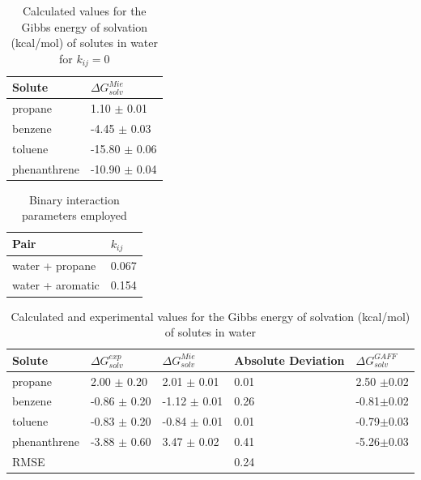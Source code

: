 \begin{table}[h]
	\centering
	\caption{Calculated values for the Gibbs energy of solvation (kcal/mol) of solutes in water for $k_{ij}=0$}
	\label{tbl:solv3}
	\begin{tabular}{ll}
		\hline
		Solute & $\Delta G_{solv}^{Mie}$ \\
		\hline
		propane   & 1.10 $\pm$ 0.01   \\
		benzene  & -4.45 $\pm$ 0.03   \\
		toluene  & -15.80 $\pm$ 0.06   \\
		phenanthrene & -10.90 $\pm$ 0.04   \\
		\hline
	\end{tabular}
\end{table}
\begin{table}[h]
  \centering
  \caption{Binary interaction parameters employed}
  \label{tbl:kij}
  \begin{tabular}{ll}
    \hline
      Pair & $k_{ij}$ \\
    \hline
    water  + propane      & 0.067  \\
    water  + aromatic      & 0.154 \\  
    \hline
  \end{tabular}
\end{table}

\begin{table}[!htb]
  \centering
  \caption{Calculated and experimental values for the Gibbs energy of solvation (kcal/mol) of solutes in water}
  \label{tbl:solv2}
  \begin{tabular}{lllll}
    \hline
     Solute      & $\Delta G_{solv}^{exp}$ & $\Delta G_{solv}^{Mie}$ & Absolute Deviation &$\Delta G_{solv}^{GAFF}$ \\
    \hline
    propane      &  2.00 $\pm$ 0.20 & 2.01 $\pm$ 0.01& 0.01 &2.50 $\pm$0.02 \\
    benzene      & -0.86 $\pm$ 0.20 & -1.12 $\pm$ 0.01    &  0.26    &-0.81$\pm$0.02 \\  
    toluene      & -0.83 $\pm$ 0.20 & -0.84 $\pm$ 0.01   &  0.01    &-0.79$\pm$0.03\\
    phenanthrene & -3.88 $\pm$ 0.60 & 3.47 $\pm$ 0.02& 0.41 &-5.26$\pm$0.03 \\
    \hline
    RMSE         &                  &               &  0.24     &      \\
    \hline
  \end{tabular}

\end{table}


